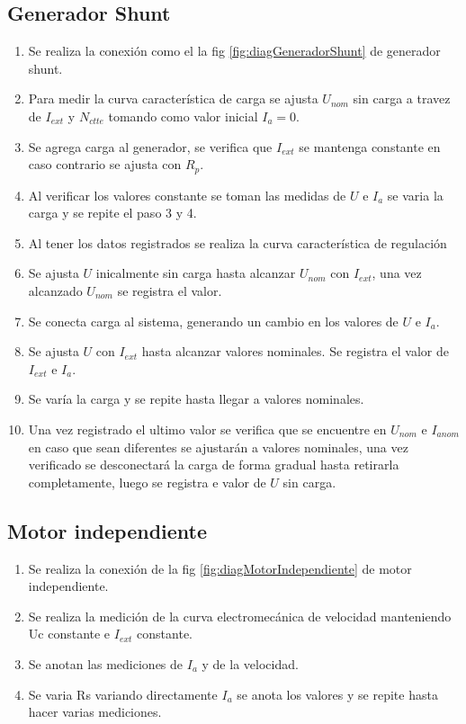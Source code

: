 \documentclass[11pt,letterpaper]{article}     %
\begin{document}
\subsection{Generador Shunt}
\begin{enumerate}
    \item Se realiza la conexión como el la fig \ref{fig:diagGeneradorShunt} de generador shunt.
    \item Para medir la curva característica de carga se ajusta $U_{nom}$ sin carga a travez de $I_{ext}$ y $N_{ctte}$ tomando como valor inicial $I_a = 0$.
    \item Se agrega carga al generador, se verifica que $I_{ext}$ se mantenga constante en caso contrario se ajusta con $R_p$.
    \item Al verificar los valores constante se toman las medidas de $U$ e $I_a$ se varia la carga y se repite el paso 3 y 4.
    \item Al tener los datos registrados se realiza la curva característica de regulación
    \item Se ajusta $U$ inicalmente sin carga hasta alcanzar $U_{nom}$ con $I_{ext}$, una vez alcanzado $U_{nom}$ se registra el valor.
    \item Se conecta carga al sistema, generando un cambio en los valores de $U$ e $I_a$.
    \item Se ajusta $U$ con $I_{ext}$ hasta alcanzar valores nominales. Se registra el valor de $I_{ext}$ e $I_a$.
    \item Se varía la carga y se repite hasta llegar a valores nominales.
    \item Una vez registrado el ultimo valor se verifica que se encuentre en $U_{nom}$ e $I_{anom}$ en caso que sean diferentes se ajustarán a valores nominales, una vez verificado se desconectará la carga de forma gradual hasta retirarla completamente, luego se registra e valor de $U$ sin carga. 
\end{enumerate}
\subsection{Motor independiente}
\begin{enumerate}
    \item Se realiza la conexión de la fig \ref{fig:diagMotorIndependiente} de motor independiente.
    \item Se realiza la medición de la curva electromecánica de velocidad manteniendo Uc constante e $I_{ext}$ constante.
    \item Se anotan las mediciones de $I_a$ y de la velocidad.
    \item Se varia Rs variando directamente $I_a$ se anota los valores y se repite hasta hacer varias mediciones.
\end{enumerate}
\end{document}
